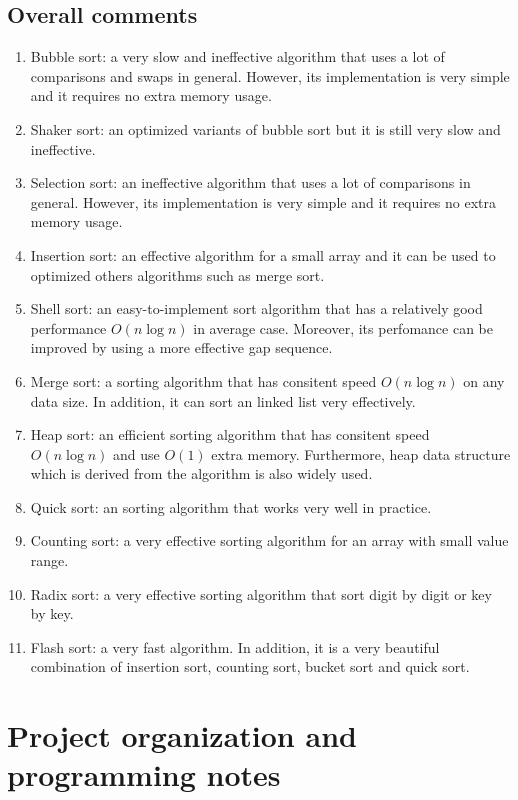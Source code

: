 \documentclass[12pt]{article}
\begin{document}
\subsection{Overall comments}
\begin{enumerate}
    \item Bubble sort: a very slow and ineffective algorithm that uses a lot of comparisons and swaps in general. However, its implementation is very simple and it requires no extra memory usage.
    \item Shaker sort: an optimized variants of bubble sort but it is still very slow and ineffective.
    \item Selection sort: an ineffective algorithm that uses a lot of comparisons in general. However, its implementation is very simple and it requires no extra memory usage.
    \item Insertion sort: an effective algorithm for a small array and it can be used to optimized others algorithms such as merge sort.
    \item Shell sort: an easy-to-implement sort algorithm that has a relatively good performance $O(n\log n)$ in average case. Moreover, its perfomance can be improved by using a more effective gap sequence.
    \item Merge sort: a sorting algorithm that has consitent speed $O(n\log n)$ on any data size. In addition, it can sort an linked list very effectively.
    \item Heap sort: an efficient sorting algorithm that has consitent speed $O(n\log n)$ and use $O(1)$ extra memory. Furthermore, heap data structure which is derived from the algorithm is also widely used.
    \item Quick sort: an sorting algorithm that works very well in practice.
    \item Counting sort: a very effective sorting algorithm for an array with small value range.
    \item Radix sort: a very effective sorting algorithm that sort digit by digit or key by key.
    \item Flash sort: a very fast algorithm. In addition, it is a very beautiful combination of insertion sort, counting sort, bucket sort and quick sort.
\end{enumerate}

\section{Project organization and programming notes}
\end{document}
